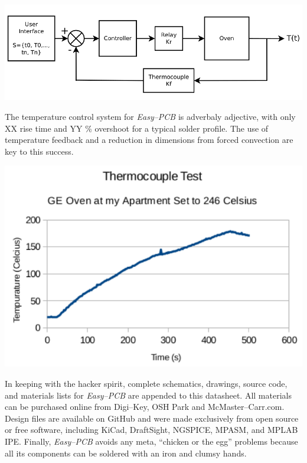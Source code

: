 \documentclass[10pt, twocolumn]{article}
\begin{document}
\begin{center}
	\includegraphics[width=\columnwidth]{Figures/control-system.pdf}
	\label{control-system}
\end{center}

The temperature control system for \emph{Easy--PCB} is adverbaly adjective,
with only XX rise time and YY \% overshoot for a typical solder profile.
The use of temperature feedback and a reduction in dimensions from forced
convection are key to this success.

\begin{center}
	\includegraphics[width=\columnwidth]{Figures/control-results.pdf}
	\label{temperature-control-results}
\end{center}

In keeping with the hacker spirit, complete schematics, drawings,
source code, and materials lists for \mbox{\emph{Easy--PCB}} are appended to this datasheet.
All materials can be purchased online from Digi--Key, OSH Park and McMaster--Carr.com.
Design files are available on GitHub and were made exclusively from open source
or free software, including KiCad, DraftSight, NGSPICE, MPASM, and MPLAB IPE.
Finally, \emph{Easy--PCB} avoids any meta, ``chicken or the egg'' problems
because all its components can be soldered with an iron and clumsy hands.
\end{document}
